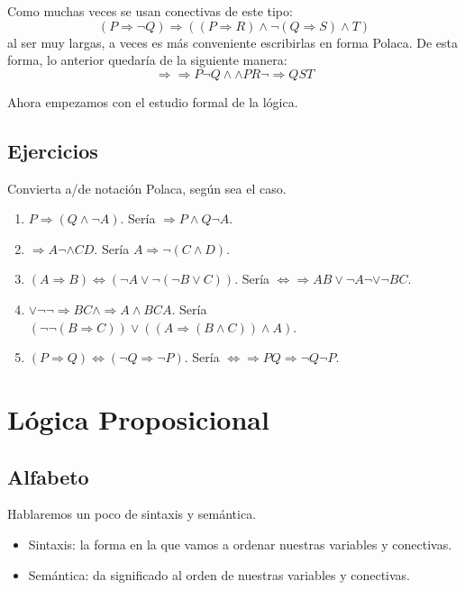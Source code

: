 \documentclass[12pt]{report}
\newcounter{it}
\theoremstyle{largebreak}
\begin{document}
    Como muchas veces se usan conectivas de este tipo:
    \begin{equation*}
        (P\Rightarrow \neg Q)\Rightarrow((P\Rightarrow R)\land\neg(Q\Rightarrow S)\land T)
    \end{equation*}
    al ser muy largas, a veces es más conveniente escribirlas en forma Polaca. De esta forma, lo anterior quedaría de la siguiente manera:
    \begin{equation*}
        \Rightarrow\Rightarrow P\neg Q\land\land PR\neg\Rightarrow Q S T 
    \end{equation*}

    Ahora empezamos con el estudio formal de la lógica.

    \section{Ejercicios}

    Convierta a/de notación Polaca, según sea el caso.

    \begin{enumerate}
        \item $P\Rightarrow(Q\land\neg A)$. Sería $\Rightarrow P\land Q \neg A$.
        \item $\Rightarrow  A\neg\land CD$. Sería $A\Rightarrow \neg(C\land D)$.
        \item $(A\Rightarrow B)\iff (\neg A\lor \neg(\neg B\lor C))$. Sería $\iff \Rightarrow A B \lor \neg A \neg \lor \neg B C$.
        \item $\lor\neg\neg\Rightarrow B C\land\Rightarrow A\land BCA$. Sería $(\neg\neg(B\Rightarrow C))\lor((A\Rightarrow (B\land C))\land A)$.
        \item $(P\Rightarrow Q)\iff (\neg Q\Rightarrow\neg P)$. Sería $\iff \Rightarrow P Q \Rightarrow \neg Q \neg P$.
    \end{enumerate}

    \chapter{Lógica Proposicional}

    \section{Alfabeto}

    Hablaremos un poco de sintaxis y semántica.

    \begin{itemize}
        \item Sintaxis: la forma en la que vamos a ordenar nuestras variables y conectivas.
        \item Semántica: da significado al orden de nuestras variables y conectivas.
    \end{itemize}
\end{document}

